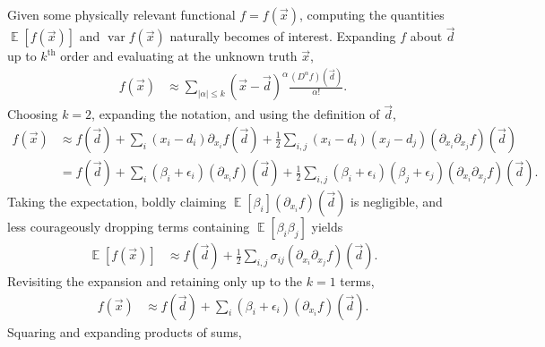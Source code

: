 \documentclass[letterpaper,11pt,nointlimits,reqno,draft]{amsbook}
\newcommand{\expect}[1]{\operatorname{\mathbb{E}}\left[#1\right]}
\begin{document}
Given some physically relevant functional $f = f\left(\vec{x}\right)$,
computing the quantities $\expect{f\left(\vec{x}\right)}$ and
$\operatorname{var} f\left(\vec{x}\right) $ naturally becomes of interest.
Expanding $f$ about $\vec{d}$ up to $k^\mathrm{th}$ order and evaluating at the
unknown truth $\vec{x}$,
\begin{align*}
  f(\vec{x})
&\approx
  \sum_{|\alpha| \le k} \left( \vec{x} - \vec{d} \right)^\alpha
  \frac{\left(D^\alpha f\right)\left(\vec{d}\right)}{\alpha!}
.
\end{align*}
Choosing $k=2$, expanding the notation, and using the definition of $\vec{d}$,
\begin{align*}
  f\left(\vec{x}\right)
&\approx
    f\left(\vec{d}\right)
  + \sum_i \left(x_i-d_i\right) \partial_{x_i} f\left(\vec{d}\right)
  + \frac{1}{2} \sum_{i,j}
                \left(x_i-d_i\right)\left(x_j-d_j\right)
                \left(\partial_{x_i} \partial_{x_j} f\right)\left(\vec{d}\right)
\\
&=
    f\left(\vec{d}\right)
  + \sum_i \left(\beta_i+\epsilon_i\right)
           \left(\partial_{x_i} f\right)\left(\vec{d}\right)
  + \frac{1}{2} \sum_{i,j}
                \left(\beta_i+\epsilon_i\right)
                \left(\beta_j+\epsilon_j\right)
                \left(\partial_{x_i} \partial_{x_j} f\right)\left(\vec{d}\right)
.
\end{align*}
Taking the expectation, boldly claiming $\expect{\beta_i}\left(\partial_{x_i}
f\right)\left(\vec{d}\right)$ is negligible, and less courageously dropping
terms containing $\expect{\beta_i \beta_j}$ yields
\begin{align*}
  \expect{f\left(\vec{x}\right)}
&\approx
    f\left(\vec{d}\right)
  + \frac{1}{2} \sum_{i,j}
                \sigma_{ij}
                \left(\partial_{x_i} \partial_{x_j} f\right)\left(\vec{d}\right)
.
\end{align*}
Revisiting the expansion and retaining only up to the $k=1$ terms,
\begin{align*}
  f\left(\vec{x}\right)
&\approx
    f\left(\vec{d}\right)
  + \sum_i \left(\beta_i+\epsilon_i\right)
           \left(\partial_{x_i} f\right)\left(\vec{d}\right)
.
\end{align*}
Squaring and expanding products of sums,
\end{document}
